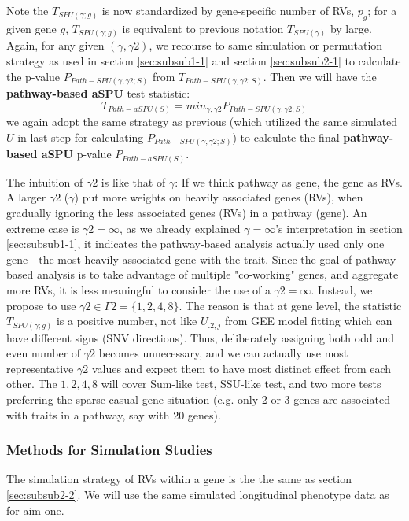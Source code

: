 \documentclass[12pt]{article}
\begin{document}
Note the $T_ { SPU(\gamma ; g) }$ is now standardized by gene-specific number of RVs, $p_g$; for a given gene $g$, $T_ { SPU(\gamma ; g) }$ is equivalent to previous notation $T_ { SPU(\gamma ) }$ by large. Again, for any given $(\gamma, \gamma2)$, we recourse to same simulation or permutation strategy as used in section \ref{sec:subsub1-1} and section \ref{sec:subsub2-1} to calculate the p-value $P _ { Path-SPU(\gamma, \gamma2 ; S) }$ from $T _ { Path-SPU(\gamma, \gamma2 ; S) }$. Then we will have the \textbf{pathway-based aSPU} test statistic:
\begin{equation}
T _ { Path-aSPU(S) } = min_{\gamma, \gamma2} P _ { Path-SPU(\gamma, \gamma2 ; S) }
\end{equation}
we again adopt the same strategy as previous (which utilized the same simulated $U$ in last step for calculating $P _ { Path-SPU(\gamma, \gamma2 ; S) }$) to calculate the final \textbf{pathway-based aSPU} p-value $P _ { Path-aSPU(S) }$.

The intuition of $\gamma 2$ is like that of $\gamma$: If we think pathway as gene, the gene as RVs. A larger $\gamma 2$ ($\gamma$) put more weights on heavily associated genes (RVs), when gradually ignoring the less associated genes (RVs) in a pathway (gene). An extreme case is $\gamma 2 = \infty$, as we already explained $\gamma = \infty$'s interpretation in section \ref{sec:subsub1-1}, it indicates the pathway-based analysis actually used only one gene - the most heavily associated gene with the trait. Since the goal of pathway-based analysis is to take advantage of multiple "co-working" genes, and aggregate more RVs, it is less meaningful to consider the use of a $\gamma 2= \infty$. Instead, we propose to use $\gamma 2 \in \Gamma 2 = \{1,2,4,8\}$. The reason is that at gene level, the statistic $T_ { SPU(\gamma ; g) }$ is a positive number, not like $U_{.2,j}$ from GEE model fitting which can have different signs (SNV directions). Thus, deliberately assigning both odd and even number of $\gamma 2$ becomes unnecessary, and we can actually use most representative $\gamma 2$ values and expect them to have most distinct effect from each other. The $1,2,4,8$ will cover Sum-like test, SSU-like test, and two more tests preferring the sparse-casual-gene situation (e.g. only 2 or 3 genes are associated with traits in a pathway, say with 20 genes). 

\subsubsection{Methods for Simulation Studies}\label{sec:aim2-2}
The simulation strategy of RVs within a gene is the the same as section \ref{sec:subsub2-2}. We will use the same simulated longitudinal phenotype data as for aim one.
\end{document}
